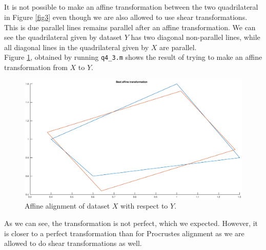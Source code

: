 \documentclass[a4paper]{article}
\begin{document}
\subsection{}
It is not possible to make an affine transformation between the two quadrilateral in Figure \ref{fig3} even though we are also allowed to use shear transformations. This is due parallel lines remains parallel after an affine transformation. We can see the quadrilateral given by dataset $Y$ has two diagonal non-parallel lines, while all diagonal lines in the quadrilateral given by $X$ are parallel. \\
Figure \ref{fig5}, obtained by running \texttt{q4\_3.m} shows the result of trying to make an affine transformation from $X$ to $Y$.
\begin{figure}[H]
  \centering
  \captionsetup{justification=centering}
  \includegraphics[width=\textwidth]{fig5.eps}
  \caption{Affine alignment of dataset $X$ with respect to $Y$.}
  \label{fig5}
\end{figure}
As we can see, the transformation is not perfect, which we expected. However, it is closer to a perfect transformation than for Procrustes alignment as we are allowed to do shear transformations as well.
\end{document}
